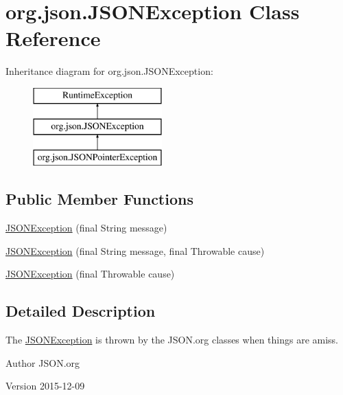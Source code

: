 \hypertarget{classorg_1_1json_1_1JSONException}{\section{org.\-json.\-J\-S\-O\-N\-Exception Class Reference}
\label{classorg_1_1json_1_1JSONException}
}
Inheritance diagram for org.\-json.\-J\-S\-O\-N\-Exception\-:\begin{figure}[H]
\begin{center}
\leavevmode
\includegraphics[height=3.000000cm]{classorg_1_1json_1_1JSONException}
\end{center}
\end{figure}
\subsection*{Public Member Functions}
\begin{DoxyCompactItemize}
\item 
\hyperlink{classorg_1_1json_1_1JSONException_a77f0c9e65c7ea12af42cebe7c4901299}{J\-S\-O\-N\-Exception} (final String message)
\item 
\hyperlink{classorg_1_1json_1_1JSONException_a009cb10b2921e438cc34db60f80bc441}{J\-S\-O\-N\-Exception} (final String message, final Throwable cause)
\item 
\hyperlink{classorg_1_1json_1_1JSONException_afec2b0f45f6e11544c0a2e7b23e361a9}{J\-S\-O\-N\-Exception} (final Throwable cause)
\end{DoxyCompactItemize}


\subsection{Detailed Description}
The \hyperlink{classorg_1_1json_1_1JSONException}{J\-S\-O\-N\-Exception} is thrown by the J\-S\-O\-N.\-org classes when things are amiss.

\begin{DoxyAuthor}{Author}
J\-S\-O\-N.\-org 
\end{DoxyAuthor}
\begin{DoxyVersion}{Version}
2015-\/12-\/09 
\end{DoxyVersion}


